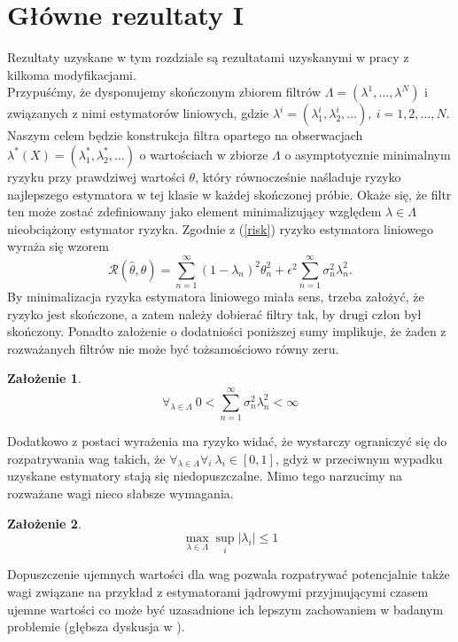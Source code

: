 \documentclass{mwart}
\newtheorem{za}{Założenie}
\begin{document}
\section{Główne rezultaty I}\label{G1}
Rezultaty uzyskane w tym rozdziale są rezultatami uzyskanymi w pracy \cite{cavalier1} z kilkoma modyfikacjami.\\
\indent Przypuśćmy, że dysponujemy skończonym zbiorem filtrów $\Lambda=(\lambda^1,\dots, \lambda^N)$ i związanych z nimi estymatorów liniowych, gdzie $\lambda^i=(\lambda^i_1,\lambda^i_2,\dots),\ i=1,2,\dots, N$. Naszym celem będzie konstrukcja filtra opartego na obserwacjach $\lambda^*(X)=(\lambda^*_1,\lambda^*_2,\dots)$ o wartościach w zbiorze $\Lambda$ o asymptotycznie minimalnym ryzyku przy prawdziwej wartości $\theta$, który równocześnie naśladuje ryzyko najlepszego estymatora w tej klasie w każdej skończonej próbie. Okaże się, że filtr ten może zostać zdefiniowany jako element minimalizujący względem $\lambda \in \Lambda$ nieobciążony estymator ryzyka. Zgodnie z (\ref{risk}) ryzyko estymatora liniowego wyraża się wzorem
\begin{displaymath}
\mathcal{R}(\hat{\theta},\theta)=\sum_{n=1}^{\infty}(1-\lambda_n)^2\theta_n^2+\epsilon^2\sum_{n=1}^{\infty}\sigma_n^2\lambda_n^2.
\end{displaymath}
By minimalizacja ryzyka estymatora liniowego miała sens, trzeba założyć, że ryzyko jest skończone, a zatem należy dobierać filtry tak, by drugi człon był skończony. Ponadto założenie o dodatniości poniższej sumy implikuje, że żaden z rozważanych filtrów nie może być tożsamościowo równy zeru.
\begin{za}
\begin{displaymath}\label{ass1}
\forall_{\lambda\in \Lambda}\ 0<\sum_{n=1}^{\infty}\sigma_n^2\lambda_n^2<\infty
\end{displaymath}
\end{za}
Dodatkowo z postaci wyrażenia ma ryzyko widać, że wystarczy ograniczyć się do rozpatrywania wag takich, że $\forall_{\lambda\in \Lambda}\forall_i\ \lambda_i\in [0,1]$, gdyż w przeciwnym wypadku uzyskane estymatory stają się niedopuszczalne. Mimo tego narzucimy na rozważane wagi nieco słabsze wymagania.
\begin{za}
\begin{displaymath}\label{ass2}
\max_{\lambda\in \Lambda}\sup_i|\lambda_i|\leq 1
\end{displaymath}
\end{za}
Dopuszczenie ujemnych wartości dla wag pozwala rozpatrywać potencjalnie także wagi związane na przykład z estymatorami jądrowymi przyjmującymi czasem ujemne wartości co może być uzasadnione ich lepszym zachowaniem w badanym problemie (głębsza dyskusja w \cite{silverman}).\\
\end{document}
